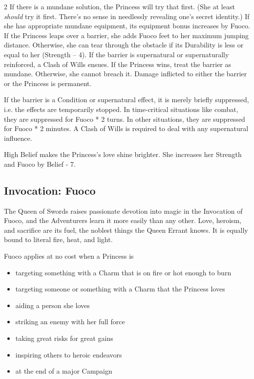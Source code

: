 \begin{multicols}{2}
If there is a mundane solution, the Princess will try that first. (She at least \textit{should} try it first. There's no sense in needlessly revealing one's secret identity.) If she has appropriate mundane equipment, its equipment bonus increases by Fuoco. If the Princess leaps over a barrier, she adds Fuoco feet to her maximum jumping distance. Otherwise, she can tear through the obstacle if its Durability is less or equal to her (Strength – 4). If the barrier is supernatural or supernaturally reinforced, a Clash of Wills ensues. If the Princess wins, treat the barrier as mundane. Otherwise, she cannot breach it. Damage inflicted to either the barrier or the Princess is permanent.

If the barrier is a Condition or supernatural effect, it is merely briefly suppressed, i.e. the effects are temporarily stopped. In time-critical situations like combat, they are suppressed for Fuoco * 2 turns. In other situations, they are suppressed for Fuoco * 2 minutes. A Clash of Wills is required to deal with any supernatural influence.

High Belief makes the Princess's love shine brighter. She increases her Strength and Fuoco by Belief - 7.

\subsection*{Invocation: Fuoco}

The Queen of Swords raises passionate devotion into magic in the Invocation of Fuoco, and the Adventurers learn it more easily than any other. Love, heroism, and sacrifice are its fuel, the noblest things the Queen Errant knows. It is equally bound to literal fire, heat, and light.

Fuoco applies at no cost when a Princess is
\begin{itemize}
\item targeting something with a Charm that is on fire or hot enough to burn
\item targeting someone or something with a Charm that the Princess loves
\item aiding a person she loves
\item striking an enemy with her full force
\item taking great risks for great gains
\item inspiring others to heroic endeavors
\item at the end of a major Campaign
\end{itemize}



\end{multicols}
